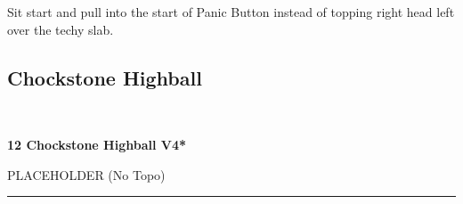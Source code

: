 \begin{multicols}{2}
\begin{adjustwidth}{0.5cm}{}
\begin{minipage}{\linewidth}
							\begin{adjustwidth}{0.5cm}{}				
							Sit start and pull into the start of Panic Button instead of topping right head left over the techy slab.
							\end{adjustwidth}
							\end{minipage}
						\end{adjustwidth}
			\subsection*{Chockstone Highball}\label{bf:Chockstone Highball}
			\begin{minipage}{\columnwidth}
			\
			\end{minipage}
			
					\begin{minipage}{\linewidth}	
					\label{rt:Chockstone Highball}
\colorbox{RoyalBlue!20}{
\textbf{
12 Chockstone Highball V4*  
}
}

					\begin{adjustwidth}{0.5cm}{}				
					PLACEHOLDER
						\newline (No Topo) 
					\end{adjustwidth}
					\end{minipage}
\end{multicols}
\rule{\textwidth}{1pt}
